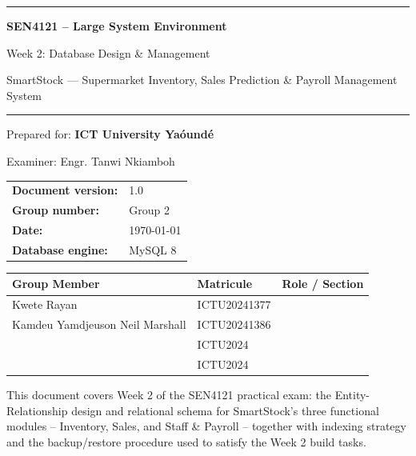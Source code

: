 \documentclass[11pt,a4paper]{report}
\newcommand{\sysname}{SmartStock}
\begin{document}
\begin{titlepage}
\begin{center}
\vspace*{1.5cm}

{\color{primary}\rule{\linewidth}{2pt}}

\vspace{0.8cm}
{\Huge\bfseries\color{primary} SEN4121 -- Large System Environment}

\vspace{0.4cm}
{\LARGE\color{primarydark} Week 2: Database Design \& Management}

\vspace{0.3cm}
{\Large\color{bodytext} \sysname{} --- Supermarket Inventory, Sales Prediction \& Payroll Management System}

\vspace{0.6cm}
{\color{primary}\rule{\linewidth}{2pt}}

\vspace{2.5cm}

{\Large Prepared for: \textbf{ICT University Ya\'ound\'e}}

\vspace{0.3cm}
{\large Examiner: Engr. Tanwi Nkiamboh}

\vspace{2cm}

\begin{tabular}{ll}
\textbf{Document version:} & 1.0 \\[4pt]
\textbf{Group number:} & Group 2 \\[4pt]
\textbf{Date:} & \today \\[4pt]
\textbf{Database engine:} & MySQL 8 \\
\end{tabular}

\vspace{1cm}

\begin{tabular}{@{}p{5.5cm}p{4cm}p{4.5cm}@{}}
\toprule
\textbf{Group Member} & \textbf{Matricule} & \textbf{Role / Section} \\
\midrule
Kwete Rayan & ICTU20241377 & \\
Kamdeu Yamdjeuson Neil Marshall & ICTU20241386 & \\
 & ICTU2024 & \\
 & ICTU2024 & \\
\bottomrule
\end{tabular}

\vfill

{\small\color{bodytext} This document covers Week 2 of the SEN4121 practical exam: the
Entity-Relationship design and relational schema for \sysname{}'s three
functional modules -- Inventory, Sales, and Staff \& Payroll -- together with
indexing strategy and the backup/restore procedure used to satisfy the Week 2
build tasks.}

\end{center}
\end{titlepage}
\end{document}
